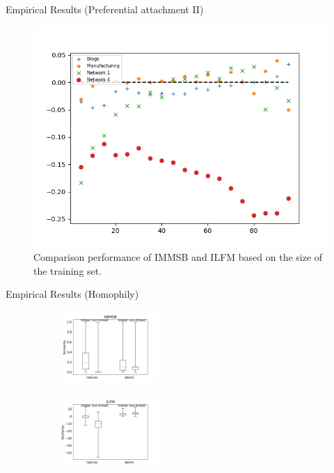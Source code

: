\begin{frame}[c]{Empirical Results (Preferential attachment II)}
        \begin{figure}[h]
            \caption{Comparison performance of IMMSB and ILFM based on the size of the training set.}
        \includegraphics[scale=0.5]{img/testset_max_20_roc_evolution}
        \end{figure}
\end{frame}


\begin{frame}[c]{Empirical Results (Homophily)}
    \begin{figure}[ht]
    \caption{Natural and latent similarities aggregated over all datasets and computed on linked and non-linked pairs of nodes for IMMSB (top) and ILFM (bottom).}
    \centering
        \begin{subfigure}
             \centering
                 \includegraphics[width=0.4\textwidth]{img/homo_mustach_immsb}
        \end{subfigure}
        \begin{subfigure}
                 \centering
              \includegraphics[width=0.4\textwidth]{img/homo_mustach_ilfm}
        \end{subfigure}
        \label{fig:homo_mustach}
    \end{figure}
\end{frame}



